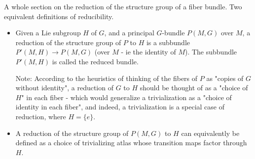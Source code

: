 \documentclass{report}
\theoremstyle{definition}
\begin{document}
A whole section on the reduction of the structure group of a fiber bundle. Two equivalent definitions of reducibility.
\begin{itemize}
    \item Given a Lie subgroup $H$ of $G$, and a principal $G$-bundle $P(M,G)$ over $M$, a reduction of the structure group of $P$ to $H$ is a subbundle $P'(M,H)\to P(M,G)$ (over $M$ - ie the identity of $M$). The subbundle $P'(M,H)$ is called the reduced bundle.

    Note: According to the heuristics of thinking of the fibers of $P$ as "copies of $G$ without identity", a reduction of $G$ to $H$ should be thought of as a "choice of $H$" in each fiber - which would generalize a trivialization as a "choice of identity in each fiber", and indeed, a trivialization is a special case of reduction, where $H=\{e\}$.
    \item A reduction of the structure group of $P(M,G)$ to $H$ can equivalently be defined as a choice of trivializing atlas whose transition maps factor through $H$.
\end{itemize}
\end{document}
